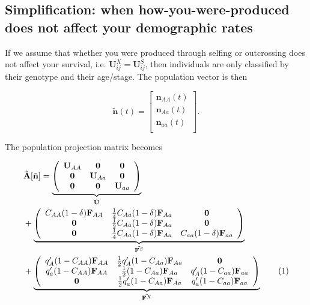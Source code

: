 \documentclass[11pt]{article}
\newcommand\numberthis{\addtocounter{equation}{1}\tag{\theequation}}
\def\mbf#1{\mathbf{#1}}
\begin{document}
\subsection*{Simplification: when how-you-were-produced does not affect your demographic rates}
If we assume that whether you were produced through selfing or outcrossing does not affect your survival, i.e. $\mathbf{U}^X_{ij}=\mathbf{U}^S_{ij}$, then individuals are only classified by their genotype and their age/stage. The population vector is then 

\begin{equation}
	\tilde{\mbf{n}}(t) =  \left[
								\begin{array}{c}
									\mbf{n}_{AA}(t) \\
									\mbf{n}_{Aa}(t) \\
									\mbf{n}_{aa}(t) \\ 
						\end{array} \right].
\end{equation}

The population projection matrix becomes

\begin{align*}
	&\tilde{\mbf{A}}[\tilde{\mbf{n}}] = 
		 \underbrace{\left(
			\begin{array}{ccc}
				\mathbf{U}_{AA} & \mbf{0} & \mbf{0}\\ 
				\mbf{0} & \mathbf{U}_{Aa} & \mbf{0} \\
				\mbf{0} & \mbf{0} & \mathbf{U}_{aa} 
			\end{array} \right)}_{\tilde{\mbf{U}}}  \\ 
	&+\underbrace{\left(
			\begin{array}{ccc}
				C_{AA} (1 - \delta) \mbf{F}_{AA} & \frac{1}{4} C_{Aa} (1 - \delta) \mbf{F}_{Aa} & \mbf{0} \\ 
				\mbf{0} & \frac{1}{2} C_{Aa} (1 - \delta) \mbf{F}_{Aa} & \mbf{0} \\
				\mbf{0} & \frac{1}{4} C_{Aa} (1 - \delta) \mbf{F}_{Aa} & C_{aa} (1 - \delta) \mbf{F}_{aa} 
			\end{array} \right)}_{\tilde{\mbf{F}^S}} \\
			&+\underbrace{\left(
			\begin{array}{ccc}
				q^{\prime}_{A} (1 - C_{AA})\mbf{F}_{AA} & \frac{1}{2} q^{\prime}_{A} (1 - C_{Aa})\mbf{F}_{Aa}  & \mbf{0} \\
				q^{\prime}_{a} (1 - C_{AA}) \mbf{F}_{AA} & \frac{1}{2} (1 - C_{Aa})\mbf{F}_{Aa}  & q^{\prime}_{A} (1 - C_{aa})\mbf{F}_{aa}   \\
				\mbf{0} & \frac{1}{2} q^{\prime}_{a} (1 - C_{Aa})\mbf{F}_{Aa} & q^{\prime}_{a} (1 - C_{aa}) \mbf{F}_{aa} 
			\end{array} \right)}_{\tilde{\mbf{F}^X}} \numberthis
\end{align*}
\end{document}
